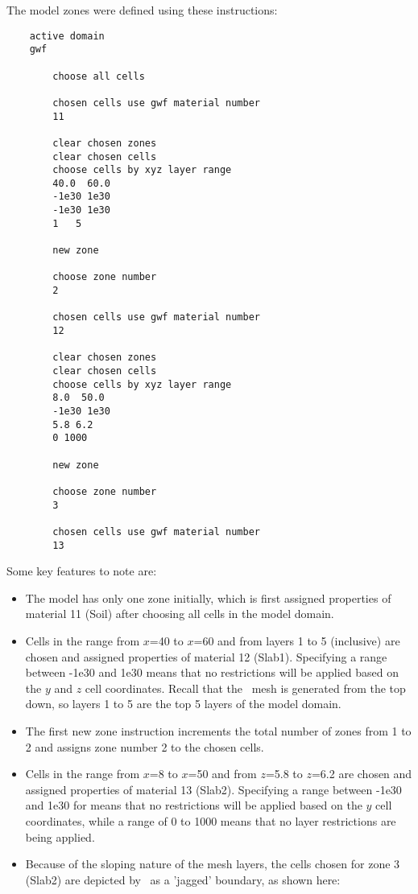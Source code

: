 {\pagebreak
The model zones were defined using these instructions:
\begin{verbatim}
    active domain
    gwf

        choose all cells

        chosen cells use gwf material number
        11

        clear chosen zones
        clear chosen cells
        choose cells by xyz layer range
        40.0  60.0
        -1e30 1e30
        -1e30 1e30
        1   5

        new zone

        choose zone number
        2

        chosen cells use gwf material number
        12

        clear chosen zones
        clear chosen cells
        choose cells by xyz layer range
        8.0  50.0
        -1e30 1e30
        5.8 6.2
        0 1000

        new zone

        choose zone number
        3

        chosen cells use gwf material number
        13
\end{verbatim}


Some key features to note are:
\begin{itemize}
    \item The model has only one zone initially, which is first assigned properties of material 11 (Soil) after choosing all cells in the model domain.
    \item Cells in the range from $x$=40 to $x$=60 and from layers 1 to 5 (inclusive) are chosen and assigned properties of material 12 (Slab1).  Specifying a range between -1e30 and 1e30 means that no restrictions will be applied based on the $y$ and $z$ cell coordinates. Recall that the \mfus\ mesh is generated from the top down, so layers 1 to 5 are the top 5 layers of the model domain.
    \item The first {\sf new zone} instruction increments the total number of zones from 1 to 2 and assigns zone number 2 to the chosen cells.    
    \item Cells in the range from $x$=8 to $x$=50 and from $z$=5.8 to $z$=6.2 are chosen and assigned properties of material 13 (Slab2).  Specifying a range between -1e30 and 1e30 for means that no restrictions will be applied based on the $y$ cell coordinates, while a range of 0 to 1000 means that no layer restrictions are being applied.
    \item Because of the sloping nature of the mesh layers, the cells chosen for zone 3 (Slab2) are depicted by \tecplot\ as a 'jagged' boundary, as shown here: 


\end{itemize}}
